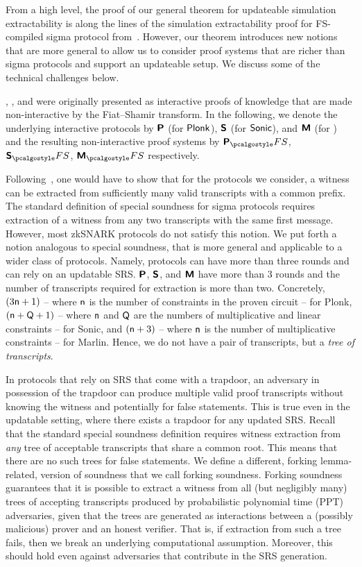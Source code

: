 From a high level, the proof of our general theorem for updateable simulation
extractability is along the lines of the simulation extractability proof for
FS-compiled sigma protocol from~\cite{INDOCRYPT:FKMV12}. However, our theorem
introduces new notions that are more general to allow us to consider proof
systems that are richer than sigma protocols and support an updateable setup. We
discuss some of the technical challenges below.

\plonk{}, \sonic{}, and \marlin{} were originally presented as interactive
proofs of knowledge that are made non-interactive by the Fiat--Shamir transform.
In the following, we denote the underlying interactive protocols by $\bm{\mathsf{P}}$
(for $\textnormal{\textsf{Plonk}}$), $\bm{\mathsf{S}}$ (for ${\textnormal{\textsf{Sonic}}}$), and $\bm{\mathsf{M}}$ (for \marlin) and
the resulting non-interactive proof systems by $\plonkprotfs$, $\sonicprotfs$,
$\marlinprotfs$ respectively.

Following~\cite{INDOCRYPT:FKMV12}, one would have to show that for the protocols
we consider, a witness can be extracted from sufficiently many valid transcripts
with a common prefix. The standard definition of special soundness for sigma
protocols requires extraction of a witness from any two transcripts with the
same first message. However, most zkSNARK protocols do not satisfy this notion.
We put forth a notion analogous to special soundness, that is more general and
applicable to a wider class of protocols. Namely, protocols can have more than three
rounds and can rely on an updatable SRS. $\bm{\mathsf{P}}$, $\bm{\mathsf{S}}$, and
$\bm{\mathsf{M}}$ have more than 3 rounds and the number of transcripts required for extraction is more
than two. Concretely, $(3 \mathsf{n} + 1)$ -- where $\mathsf{n}$ is the number of
constraints in the proven circuit -- for Plonk, $(\mathsf{n} + \mathsf{Q} + 1)$
-- where $\mathsf{n}$ and $\mathsf{Q}$ are the numbers of multiplicative and
linear constraints -- for Sonic, and $(\mathsf{n} + 3)$ -- where $\mathsf{n}$
is the number of multiplicative constraints -- for Marlin. Hence, we do not have
a pair of transcripts, but a \emph{tree of transcripts}.

In protocols that rely on SRS that come with a trapdoor, an adversary in
possession of the trapdoor can produce multiple valid proof transcripts without
knowing the witness and potentially for false statements. This is true even in
the updatable setting, where there exists a trapdoor for any updated SRS. Recall
that the standard special soundness definition requires witness extraction from
\emph{any} tree of acceptable transcripts that share a common root. This means
that there are no such trees for false statements. We define a different,
forking lemma-related, version of soundness that we call forking soundness.
Forking soundness guarantees that it is possible to extract a witness from all
(but negligibly many) trees of accepting transcripts produced by probabilistic
polynomial time (PPT) adversaries, given that the trees are generated as
interactions between a (possibly malicious) prover and an honest verifier. That
is, if extraction from such a tree fails, then we break an underlying
computational assumption. Moreover, this should hold even against adversaries
that contribute in the SRS generation.

